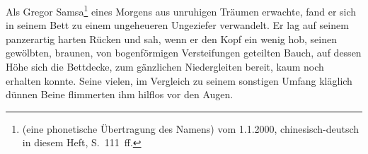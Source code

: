 

\printtitle

Als Gregor Samsa\footnote{ (eine phonetische Übertragung des Namens) vom 1.1.2000, chinesisch-deutsch in diesem Heft, S.~111~ff.} eines Morgens aus unruhigen Träumen erwachte, fand er sich in seinem Bett zu einem ungeheueren Ungeziefer verwandelt. Er lag auf seinem panzerartig harten Rücken und sah, wenn er den Kopf ein wenig hob, seinen gewölbten, braunen, von bogenförmigen Versteifungen geteilten Bauch, auf dessen Höhe sich die Bettdecke, zum gänzlichen Niedergleiten bereit, kaum noch erhalten konnte. Seine vielen, im Vergleich zu seinem sonstigen Umfang kläglich dünnen Beine flimmerten ihm hilflos vor den Augen.

